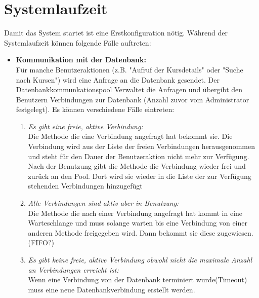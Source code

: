 \section{Systemlaufzeit}
		Damit das System startet ist eine Erstkonfiguration nötig. Während der Systemlaufzeit können folgende Fälle auftreten:
		\begin{itemize}
			\item \textbf{Kommunikation mit der Datenbank:}\\
			 Für manche Benutzeraktionen (z.B. "Aufruf der Kursdetails" oder "Suche nach Kursen") wird eine Anfrage an die Datenbank gesendet. Der Datenbankkommunkationspool Verwaltet die Anfragen und übergibt den Benutzern Verbindungen zur Datenbank (Anzahl zuvor vom Administrator festgelegt). Es können verschiedene Fälle eintreten:
			\begin{enumerate}
				\item \emph{Es gibt eine freie, aktive Verbindung:} \\
				Die Methode die eine Verbindung angefragt hat bekommt sie. Die Verbindung wird aus der Liste der freien Verbindungen herausgenommen und steht für den Dauer der Benutzeraktion nicht mehr zur Verfügung. Nach der Benutzung gibt die Methode die Verbindung wieder frei und zurück an den Pool. Dort wird sie wieder in die Liste der zur Verfügung stehenden Verbindungen hinzugefügt
				\item \emph{Alle Verbindungen sind aktiv aber in Benutzung:} \\
				Die Methode die nach einer Verbindung angefragt hat kommt in eine Warteschlange und muss solange warten bis eine Verbindung von einer anderen Methode freigegeben wird. Dann bekommt sie diese zugewiesen.(FIFO?)
				\item \emph{Es gibt keine freie, aktive Verbindung obwohl nicht die maximale Anzahl an Verbindungen erreicht ist:}\\
				 Wenn eine Verbindung von der Datenbank terminiert wurde(Timeout) muss eine neue Datenbankverbindung erstellt werden.
				

\end{enumerate}
\end{itemize}
